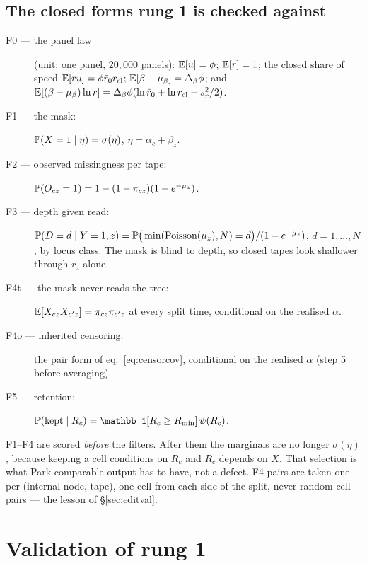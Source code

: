 \subsection{The closed forms rung 1 is checked against}\label{sec:drop1cf}

\begin{description}
  \item[F0 --- the panel law] (unit: one panel, $20{,}000$ panels):
        $\mathbb{E}[u]=\phi$; $\mathbb{E}[r]=1$; the closed share of speed $\mathbb{E}[ru]=\phi\bar r_0r_{\rm cl}$;
        $\mathbb{E}[\beta-\mu_\beta]=\Delta_\beta\phi$; and
        $\mathbb{E}[(\beta-\mu_\beta)\ln r]=\Delta_\beta\phi(\ln\bar r_0+\ln r_{\rm cl}-s_r^2/2)$.
  \item[F1 --- the mask:] $\mathbb{P}(X=1\mid\eta)=\sigma(\eta)$, $\eta=\alpha_c+\beta_z$.
  \item[F2 --- observed missingness per tape:] $\mathbb{P}(O_{cz}=1)=1-(1-\pi_{cz})(1-e^{-\mu_z})$.
  \item[F3 --- depth given read:]
        $\mathbb{P}(D=d\mid Y=1,z)=\mathbb{P}\big(\min(\operatorname{Poisson}(\mu_z),N)=d\big)/(1-e^{-\mu_z})$, $d=1,\dots,N$,
        by locus class. The mask is blind to depth, so closed tapes look shallower through $r_z$ alone.
  \item[F4t --- the mask never reads the tree:] $\mathbb{E}[X_{cz}X_{c'z}]=\pi_{cz}\pi_{c'z}$ at every split
        time, conditional on the realised $\alpha$.
  \item[F4o --- inherited censoring:] the pair form of eq.~\eqref{eq:censorcov}, conditional on the
        realised $\alpha$ (step 5 before averaging).
  \item[F5 --- retention:] $\Prob(\text{kept}\mid R_c)=\mathbb 1[R_c\ge R_{\min}]\,\psi(R_c)$.
\end{description}
F1--F4 are scored \emph{before} the filters. After them the marginals are no longer
$\sigma(\eta)$, because keeping a cell conditions on $R_c$ and $R_c$ depends on $X$. That selection is
what Park-comparable output has to have, not a defect. F4 pairs are taken one per (internal node,
tape), one cell from each side of the split, never random cell pairs --- the lesson of
\S\ref{sec:editval}.

\section{Validation of rung 1}\label{sec:drop1val}

